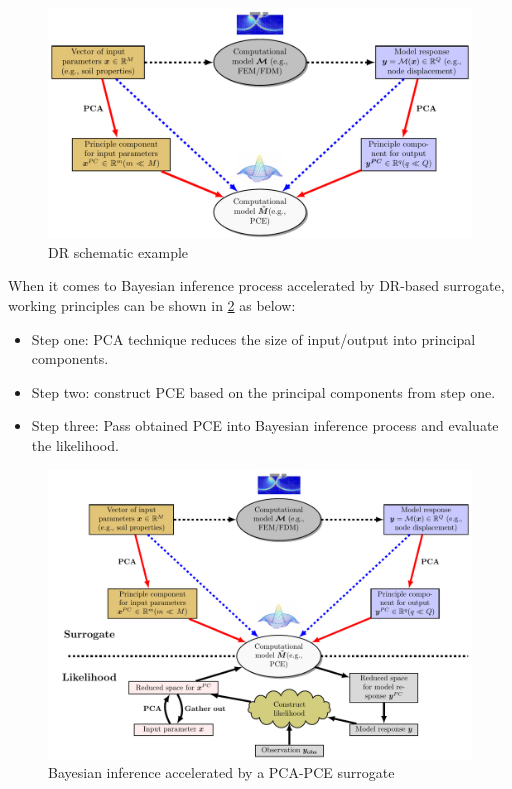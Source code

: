 \begin{figure}[htbp]
    \centering
    \includegraphics[width = 140mm]{Figures/figure-PCA_PCE.pdf}
    \caption{\acrfull{DR} schematic example}
    \label{fig: PCA-PCE}
\end{figure}
When it comes to Bayesian inference process accelerated by DR-based surrogate, working principles can be shown in \cref{fig: PCA-PCE-BI} as below:
\begin{itemize}[left = 0pt]
    \item Step one: \acrshort{PCA} technique reduces the size of input/output into principal components.
    \item Step two: construct \acrshort{PCE} based on the principal components from step one.
    \item Step three: Pass obtained \acrshort{PCE} into Bayesian inference process and evaluate the likelihood. 
\end{itemize}
\begin{figure}[htbp]
    \centering
    \includegraphics[width = 140mm]{Figures/figure-PCA_PCE_BI.pdf}
    \caption{Bayesian inference accelerated by a PCA-PCE surrogate}
    \label{fig: PCA-PCE-BI}
\end{figure}
